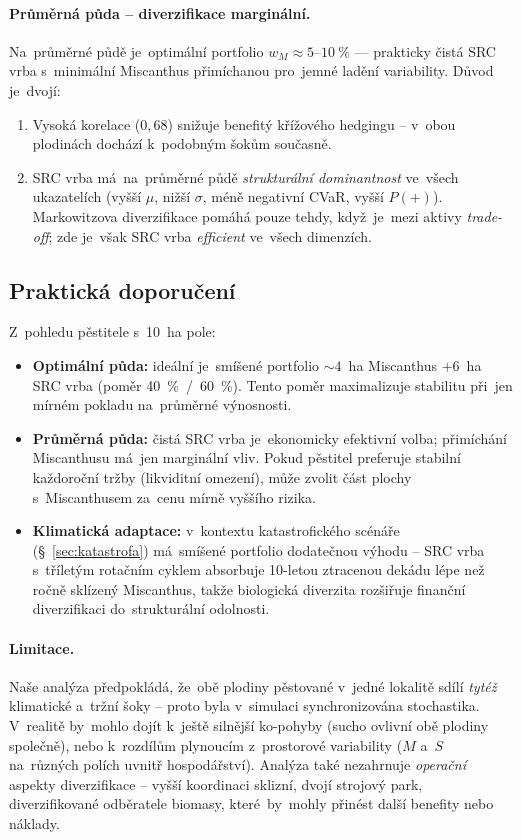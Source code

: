 \paragraph{Průměrná půda -- diverzifikace marginální.}
Na~průměrné půdě je~optimální portfolio $w_M \approx 5$--$10~\%$ ---
prakticky čistá SRC vrba s~minimální Miscanthus přimíchanou pro~jemné
ladění variability. Důvod je~dvojí:
\begin{enumerate}
\item Vysoká korelace ($0{,}68$) snižuje benefitý křížového hedgingu --
      v~obou plodinách dochází k~podobným šokům současně.
\item SRC vrba má~na~průměrné půdě \emph{strukturální dominantnost} ve~všech
      ukazatelích (vyšší $\mu$, nižší $\sigma$, méně negativní CVaR,
      vyšší $P(+)$). Markowitzova diverzifikace pomáhá pouze tehdy, když~je~mezi
      aktivy \emph{trade-off}; zde je~však SRC vrba \emph{efficient}
      ve~všech dimenzích.
\end{enumerate}

\subsection{Praktická doporučení}
\label{subsec:portfolio-doporuceni}

Z~pohledu pěstitele s~10~ha pole:
\begin{itemize}
\item \textbf{Optimální půda:} ideální je~smíšené portfolio
      $\sim 4$~ha Miscanthus $+ 6$~ha SRC vrba (poměr 40~\%~/~60~\%).
      Tento poměr maximalizuje stabilitu při~jen mírném pokladu
      na~průměrné výnosnosti.
\item \textbf{Průměrná půda:} čistá SRC vrba je~ekonomicky efektivní
      volba; přimíchání Miscanthusu má~jen marginální vliv. Pokud
      pěstitel preferuje stabilní každoroční tržby (likviditní omezení),
      může zvolit část plochy s~Miscanthusem za~cenu mírně
      vyššího rizika.
\item \textbf{Klimatická adaptace:} v~kontextu katastrofického scénáře
      (\S~\ref{sec:katastrofa}) má~smíšené portfolio dodatečnou výhodu --
      SRC vrba s~tříletým rotačním cyklem absorbuje 10-letou ztracenou
      dekádu lépe než ročně sklízený Miscanthus, takže biologická
      diverzita rozšiřuje finanční diverzifikaci do~strukturální odolnosti.
\end{itemize}

\paragraph{Limitace.}
Naše analýza předpokládá, že~obě plodiny pěstované v~jedné lokalitě sdílí
\emph{tytéž} klimatické a~tržní šoky -- proto byla v~simulaci
synchronizována stochastika. V~realitě by~mohlo dojít k~ještě silnější
ko-pohyby (sucho ovlivní obě plodiny společně), nebo k~rozdílům
plynoucím z~prostorové variability ($M$ a~$S$ na~různých polích uvnitř
hospodářství). Analýza také nezahrnuje \emph{operační} aspekty
diverzifikace -- vyšší koordinaci sklizní, dvojí strojový park,
diverzifikované odběratele biomasy, které~by~mohly přinést další
benefity nebo náklady.

